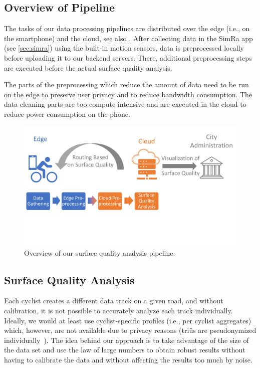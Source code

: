 \subsection{Overview of Pipeline}
\label{subsec:overview_of_pipeline}
The tasks of our data processing pipelines are distributed over the edge (i.e., on the smartphone) and the cloud, see also .
After collecting data in the SimRa app (see \ref{sec:simra}) using the built-in motion sensors, data is preprocessed locally before uploading it to our backend servers.
There, additional preprocessing steps are executed before the actual surface quality analysis.

The parts of the preprocessing which reduce the amount of data need to be run on the edge to preserve user privacy and to reduce bandwidth consumption.
The data cleaning parts are too compute-intensive and are executed in the cloud to reduce power consumption on the phone.

\begin{figure}
    \centering
    \includegraphics[width=\columnwidth]{fig/overview.pdf}
    \caption{%
        Overview of our surface quality analysis pipeline.
    }%
    \label{fig:overview}
\end{figure}

\subsection{Surface Quality Analysis}
\label{subsec:surface_quality_analysis}
Each cyclist creates a different data track on a given road, and without calibration, it is not possible to accurately analyze each track individually.
Ideally, we would at least use cyclist-specific profiles (i.e., per cyclist aggregates) which, however, are not available due to privacy reasons (triüs are pseudonymized individually~\cite{karakaya2020simra}).
The idea behind our approach is to take advantage of the size of the data set and use the law of large numbers to obtain robust results without having to calibrate the data and without affecting the results too much by noise.

